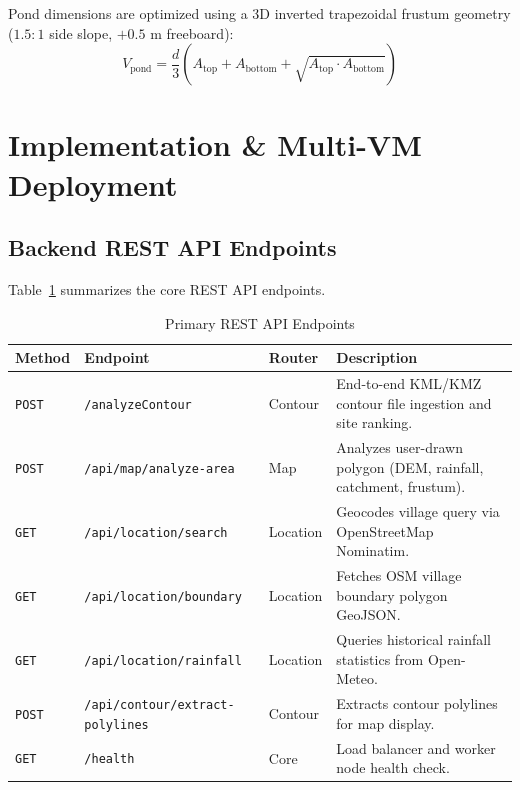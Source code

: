\documentclass[manuscript,screen]{acmart}
\begin{document}
Pond dimensions are optimized using a 3D inverted trapezoidal frustum geometry ($1.5:1$ side slope, $+0.5\text{ m}$ freeboard):
\begin{equation}
V_{\text{pond}} = \frac{d}{3} \left( A_{\text{top}} + A_{\text{bottom}} + \sqrt{A_{\text{top}} \cdot A_{\text{bottom}}} \right)
\end{equation}

\section{Implementation \& Multi-VM Deployment}
\label{sec:implementation}

\subsection{Backend REST API Endpoints}
Table~\ref{tab:endpoints} summarizes the core REST API endpoints.

\begin{table}[h]
  \caption{Primary REST API Endpoints}
  \label{tab:endpoints}
  \begin{tabular}{@{}lllp{6cm}@{}}
    \toprule
    Method & Endpoint & Router & Description \\
    \midrule
    \texttt{POST} & \texttt{/analyzeContour} & Contour & End-to-end KML/KMZ contour file ingestion and site ranking. \\
    \texttt{POST} & \texttt{/api/map/analyze-area} & Map & Analyzes user-drawn polygon (DEM, rainfall, catchment, frustum). \\
    \texttt{GET} & \texttt{/api/location/search} & Location & Geocodes village query via OpenStreetMap Nominatim. \\
    \texttt{GET} & \texttt{/api/location/boundary} & Location & Fetches OSM village boundary polygon GeoJSON. \\
    \texttt{GET} & \texttt{/api/location/rainfall} & Location & Queries historical rainfall statistics from Open-Meteo. \\
    \texttt{POST} & \texttt{/api/contour/extract-polylines} & Contour & Extracts contour polylines for map display. \\
    \texttt{GET} & \texttt{/health} & Core & Load balancer and worker node health check. \\
    \bottomrule
  \end{tabular}
\end{table}
\end{document}
